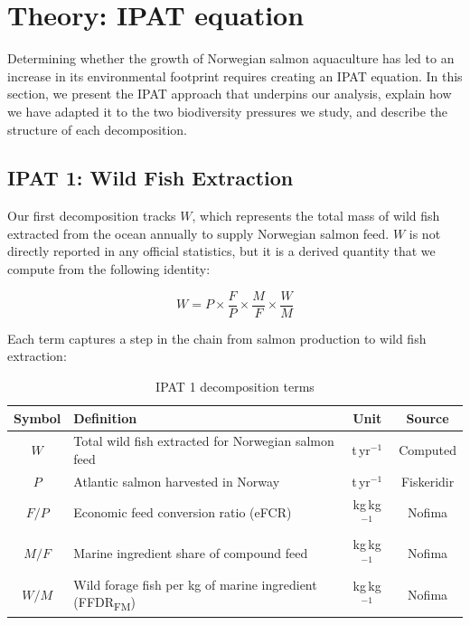 \documentclass[12pt, a4paper]{report}
\begin{document}
\chapter{Theory: IPAT equation}

Determining whether the growth of Norwegian salmon aquaculture has led to an increase in its environmental footprint requires creating an IPAT equation. In this section, we present the IPAT approach that underpins our analysis, explain how we have adapted it to the two biodiversity pressures we study, and describe the structure of each decomposition.

\section{IPAT 1: Wild Fish Extraction}

Our first decomposition tracks $W$, which represents the total mass of wild fish extracted from the ocean annually to supply Norwegian salmon feed. $W$ is not directly reported in any official statistics, but it is a derived quantity that we compute from the following identity:

\begin{equation}
    W = P \times \frac{F}{P} \times \frac{M}{F} \times \frac{W}{M}
\end{equation}

Each term captures a step in the chain from salmon production
to wild fish extraction:

\begin{table}[h]
\centering
\caption{IPAT 1 decomposition terms}
\begin{tabularx}{\textwidth}{c X c c}
\hline
\textbf{Symbol} & \textbf{Definition} & \textbf{Unit} & \textbf{Source} \\
\hline
$W$   & Total wild fish extracted for Norwegian salmon feed
      & t\,yr$^{-1}$ & Computed \\[4pt]
$P$   & Atlantic salmon harvested in Norway
      & t\,yr$^{-1}$ & Fiskeridir \\[4pt]
$F/P$ & Economic feed conversion ratio (eFCR)
      & kg\,kg$^{-1}$ & Nofima \\[4pt]
$M/F$ & Marine ingredient share of compound feed
      & kg\,kg$^{-1}$ & Nofima \\[4pt]
$W/M$ & Wild forage fish per kg of marine ingredient (FFDR\textsubscript{FM})
      & kg\,kg$^{-1}$ & Nofima \\
\hline
\end{tabularx}
\label{tab:ipat1}
\end{table}
\end{document}
